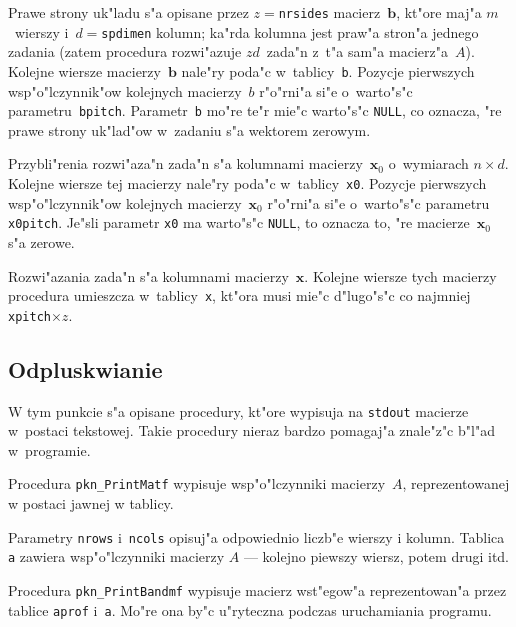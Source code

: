 Prawe strony uk"ladu s"a opisane przez $z=$\texttt{nrsides} macierz~$\bm{b}$,
kt"ore maj"a $m$~wierszy i~$d=$\texttt{spdimen} kolumn; ka"rda kolumna jest
praw"a stron"a jednego zadania (zatem procedura rozwi"azuje $zd$~zada"n z~t"a
sam"a macierz"a~$A$).
Kolejne wiersze macierzy~$\bm{b}$ nale"ry poda"c w~tablicy~\texttt{b}.
Pozycje pierwszych wsp"o"lczynnik"ow kolejnych macierzy~$b$ r"o"rni"a si"e
o~warto"s"c parametru~\texttt{bpitch}.
Parametr~\texttt{b} mo"re te"r mie"c warto"s"c \texttt{NULL}, co oznacza,
"re prawe strony uk"lad"ow w~zadaniu s"a wektorem zerowym.

Przybli"renia rozwi"aza"n zada"n s"a kolumnami macierzy~$\bm{x}_0$
o~wymiarach $n\times d$. Kolejne wiersze tej macierzy nale"ry poda"c
w~tablicy~\texttt{x0}. Pozycje pierwszych wsp"o"lczynnik"ow
kolejnych macierzy~$\bm{x}_0$ r"o"rni"a si"e o~warto"s"c parametru
\texttt{x0pitch}. Je"sli parametr \texttt{x0} ma warto"s"c
\texttt{NULL}, to oznacza to, "re macierze~$\bm{x}_0$ s"a zerowe.

Rozwi"azania zada"n s"a kolumnami macierzy~$\bm{x}$. Kolejne wiersze tych
macierzy procedura umieszcza w~tablicy~\texttt{x}, kt"ora musi mie"c
d"lugo"s"c co najmniej \texttt{xpitch}$\times z$.


\newpage
\subsection{Odpluskwianie}

W tym punkcie s"a opisane procedury, kt"ore wypisuja na \texttt{stdout}
macierze w~postaci tekstowej. Takie procedury nieraz bardzo pomagaj"a
znale"z"c b"l"ad w~programie.

\vspace{\bigskipamount}
Procedura \texttt{pkn\_PrintMatf} wypisuje wsp"o"lczynniki macierzy~$A$,
reprezentowanej w postaci jawnej w tablicy.

Parametry \texttt{nrows} i~\texttt{ncols} opisuj"a odpowiednio liczb"e
wierszy i kolumn. Tablica \texttt{a} zawiera wsp"o"lczynniki macierzy $A$
--- kolejno piewszy wiersz, potem drugi itd.

\vspace{\bigskipamount}
Procedura \texttt{pkn\_PrintBandmf} wypisuje macierz
wst"egow"a reprezentowan"a przez tablice \texttt{aprof} i~\texttt{a}.
Mo"re ona by"c u"ryteczna podczas uruchamiania programu.

